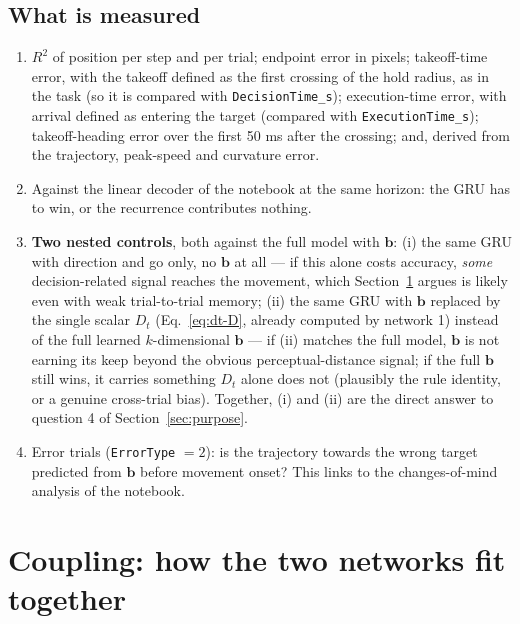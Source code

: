 \documentclass[11pt,a4paper]{article}
\newcommand{\vect}[1]{\bm{#1}}
\begin{document}
\subsection{What is measured}

\begin{enumerate}[leftmargin=*]
\item $R^2$ of position per step and per trial; endpoint error in pixels; takeoff-time
      error, with the takeoff defined as the first crossing of the hold radius, as in the
      task (so it is compared with \texttt{DecisionTime\_s}); execution-time error, with
      arrival defined as entering the target (compared with \texttt{ExecutionTime\_s});
      takeoff-heading error over the first 50 ms after the crossing; and, derived from
      the trajectory, peak-speed and curvature error.
\item Against the linear decoder of the notebook at the same horizon: the GRU has to
      win, or the recurrence contributes nothing.
\item \textbf{Two nested controls}, both against the full model with $\vect{b}$:
      (i) the same GRU with direction and go only, no $\vect{b}$ at all — if this alone
      costs accuracy, \emph{some} decision-related signal reaches the movement, which
      Section~\ref{sec:within} argues is likely even with weak trial-to-trial memory;
      (ii) the same GRU with $\vect{b}$ replaced by the single scalar $D_t$
      (Eq.~\eqref{eq:dt-D}, already computed by network 1) instead of the full learned
      $k$-dimensional $\vect{b}$ — if (ii) matches the full model, $\vect{b}$ is not
      earning its keep beyond the obvious perceptual-distance signal; if the full
      $\vect{b}$ still wins, it carries something $D_t$ alone does not (plausibly the
      rule identity, or a genuine cross-trial bias). Together, (i) and (ii) are the
      direct answer to question 4 of Section~\ref{sec:purpose}.
\item Error trials (\texttt{ErrorType} $= 2$): is the trajectory towards the wrong
      target predicted from $\vect{b}$ before movement onset? This links to the
      changes-of-mind analysis of the notebook.
\end{enumerate}

\section{Coupling: how the two networks fit together}
\label{sec:within}
\end{document}
